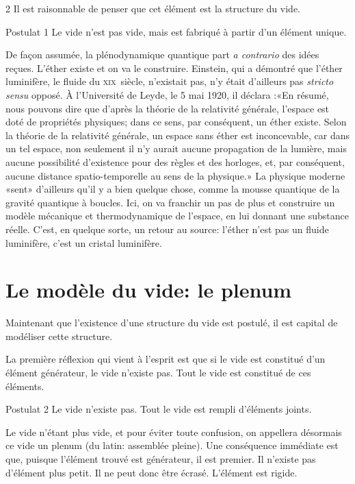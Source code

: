 \begin{multicols}{2}
Il est raisonnable de penser que cet élément est la structure du vide. 

\begin{mybox}[breakable,colback=blue!10, colbacktitle=pkcolor]{Postulat 1}
Le vide n'est pas vide, mais est fabriqué à partir d'un élément unique.
\end{mybox}
\medskip

De façon assumée, la plénodynamique quantique part \textit{a contrario} des
idées reçues. L'éther existe et on va le construire. Einstein, qui a
démontré que l'éther luminifère, le fluide du \textsc{xix}\ieme\ siècle, n'existait
pas, n'y était d'ailleurs pas \textit{stricto sensu} opposé. À l'Université de
Leyde, le 5 mai 1920, il déclara \cite{einstein1920ether}:«En
résumé, nous pouvons dire que d’après la théorie de la relativité
générale, l’espace est doté de propriétés physiques; dans ce sens,
par conséquent, un éther existe. Selon la théorie de la relativité
générale, un espace sans éther est inconcevable, car dans un tel
espace, non seulement il n’y aurait aucune propagation de la lumière,
mais aucune possibilité d’existence pour des règles et des horloges,
et, par conséquent, aucune distance spatio-temporelle au sens de la
physique.» La physique moderne «sent» d'ailleurs qu'il y a bien
quelque chose, comme la mousse quantique de la gravité quantique à
boucles. Ici, on va franchir un pas de plus et construire un modèle
mécanique et thermodynamique de l'espace, en lui donnant une substance
réelle. C'est, en quelque sorte, un retour au source: l'éther n'est
pas un fluide luminifère, c'est un cristal luminifère.


\section{Le modèle du vide: le plenum}

Maintenant que l'existence d'une structure du vide est postulé, il est
capital de modéliser cette structure.

La première réflexion qui vient à l'esprit est que si le vide est
constitué d'un élément générateur, le vide n'existe pas. Tout le vide
est constitué de ces éléments.

\begin{mybox}[breakable,colback=blue!10, colbacktitle=pkcolor]{Postulat 2}
Le vide n'existe pas. Tout le vide est rempli d'éléments joints.
\end{mybox}
\medskip

Le vide n'étant plus vide, et pour éviter toute confusion, on
appellera désormais ce vide un plenum (du latin: assemblée pleine).
Une conséquence immédiate est que, puisque l'élément trouvé est
générateur, il est premier. Il n'existe pas d'élément plus petit. Il
ne peut donc être écrasé. L'élément est rigide.


\end{multicols}
